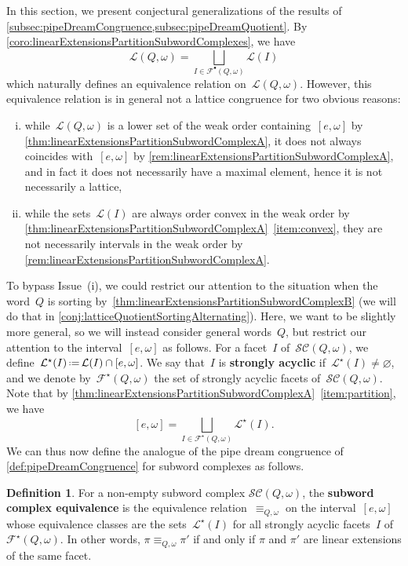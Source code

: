 \documentclass[reqno]{amsart}
\theoremstyle{definition}
\newtheorem{definition}[theorem]{Definition}
\newcommand{\eqdef}{\mbox{\,\raisebox{0.2ex}{\scriptsize\ensuremath{\mathrm:}}\ensuremath{=}\,}} %
\newcommand{\defn}[1]{\textbf{\textsf{\color{PineGreen} #1}}} %
\newcommand{\linearExtensions}{\mathcal{L}} %
\newcommand{\strongLinearExtensions}{\mathcal{L}^\star} %
\newcommand{\subwordComplex}{\mathcal{SC}} %
\newcommand{\subwordAcyclicFacets}{\mathcal{F}^\bullet} %
\newcommand{\subwordStronglyAcyclicFacets}{\mathcal{F}^\star} %
\begin{document}
In this section, we present conjectural generalizations of the results of \cref{subsec:pipeDreamCongruence,subsec:pipeDreamQuotient}.
By \cref{coro:linearExtensionsPartitionSubwordComplexes}, we have
\[
\linearExtensions(Q,\omega) = \bigsqcup_{I \in \subwordAcyclicFacets(Q, \omega)} \linearExtensions(I)
\]
which naturally defines an equivalence relation on~$\linearExtensions(Q,\omega)$.
However, this equivalence relation is in general not a lattice congruence for two obvious reasons:
\begin{enumerate}[(i)]
\item while~$\linearExtensions(Q,\omega)$ is a lower set of the weak order containing~$[e, \omega]$ by \cref{thm:linearExtensionsPartitionSubwordComplexA}, it does not always coincides with~$[e, \omega]$ by \cref{rem:linearExtensionsPartitionSubwordComplexA}, and in fact it does not necessarily have a maximal element, hence it is not necessarily a lattice,
\item while the sets~$\linearExtensions(I)$ are always order convex in the weak order by \cref{thm:linearExtensionsPartitionSubwordComplexA}~\eqref{item:convex}, they are not necessarily intervals in the weak order by \cref{rem:linearExtensionsPartitionSubwordComplexA}.
\end{enumerate}
To bypass Issue~(i), we could restrict our attention to the situation when the word~$Q$ is sorting by~\cref{thm:linearExtensionsPartitionSubwordComplexB} (we will do that in \cref{conj:latticeQuotientSortingAlternating}).
Here, we want to be slightly more general, so we will instead consider general words~$Q$, but restrict our attention to the interval~$[e, \omega]$ as follows.
For a facet~$I$ of~$\subwordComplex(Q, \omega)$, we define~$\strongLinearExtensions(I) \eqdef \linearExtensions(I) \cap [e, \omega]$.
We say that~$I$ is \defn{strongly acyclic} if~$\strongLinearExtensions(I) \ne \varnothing$, and we denote by~$\subwordStronglyAcyclicFacets(Q, \omega)$ the set of strongly acyclic facets of~$\subwordComplex(Q, \omega)$.
Note that by \cref{thm:linearExtensionsPartitionSubwordComplexA}~\eqref{item:partition}, we have
\[
[e, \omega] = \bigsqcup_{I\in\subwordStronglyAcyclicFacets(Q,\omega)} \strongLinearExtensions(I).
\]
We can thus now define the analogue of the pipe dream congruence of \cref{def:pipeDreamCongruence} for subword complexes as follows.

\begin{definition}
\label{def:pipeDreamCongruenceSubwordComplexes}
For a non-empty subword complex $\subwordComplex(Q,\omega)$, the \defn{subword complex equivalence} is the equivalence relation~$\equiv_{Q,\omega}$ on the interval~$[e, \omega]$  whose equivalence classes are the sets~$\strongLinearExtensions(I)$ for all strongly acyclic facets~$I$ of~$\subwordStronglyAcyclicFacets(Q, \omega)$.
In other words, $\pi \equiv_{Q,\omega} \pi'$ if and only if $\pi$ and $\pi'$ are linear extensions of the same facet.  
\end{definition}
\end{document}
